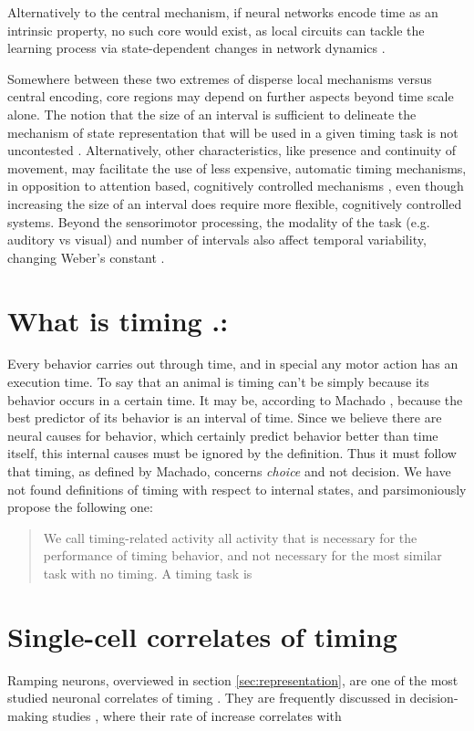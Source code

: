 Alternatively to the central mechanism, if neural networks encode time as an intrinsic property, no such core would exist, as local circuits can tackle the learning process via state-dependent changes in network dynamics \cite{mauk2004neural, paton2018neural, buonomano1995temporal, motanis2018short}. 

Somewhere between these two extremes of disperse local mechanisms versus central encoding, core regions may depend on further aspects beyond time scale alone. The notion that the size of an interval is sufficient to delineate the mechanism of state representation that will be used in a given timing task is not uncontested \cite{van20168}. Alternatively, other characteristics, like presence and continuity of movement, may facilitate the use of less expensive, automatic timing mechanisms, in opposition to attention based, cognitively controlled mechanisms \cite{lewis2003distinct}, even though increasing the size of an interval does require more flexible, cognitively controlled systems. Beyond the sensorimotor processing, the modality of the task (e.g. auditory vs visual) and number of intervals also affect temporal variability, changing Weber's constant \cite{merchant2008we}.

\section{What is timing .:}
Every behavior carries out through time, and in special any motor action has an execution time. To say that an animal is timing can't be simply because its behavior occurs in a certain time. It may be, according to Machado \cite{machado2009learning}, because the best predictor of its behavior is an interval of time. Since we believe there are neural causes for behavior, which certainly predict behavior better than time itself, this internal causes must be ignored by the definition. Thus it must follow that timing, as defined by Machado, concerns \textit{choice} and not decision. We have not found definitions of timing with respect to internal states, and parsimoniously propose the following one: 
\begin{quote}
We call timing-related activity all activity that is necessary for the performance of timing behavior, and not necessary for the most similar task with no timing.
A timing task is 
\end{quote}


\section{Single-cell correlates of timing}
Ramping neurons, overviewed in section \ref{sec:representation}, are one of the most studied neuronal correlates of timing \cite{}. They are frequently discussed in decision-making studies \cite{}, where their rate of increase correlates with 


